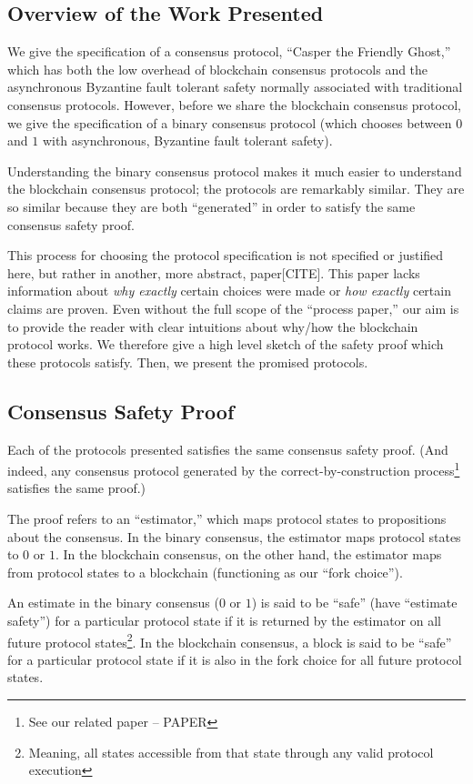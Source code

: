 \documentclass{article}
\theoremstyle{definition}
\begin{document}
\subsection{Overview of the Work Presented}

We give the specification of a consensus protocol, ``Casper the Friendly Ghost,'' which has both the low overhead of blockchain consensus protocols and the asynchronous Byzantine fault tolerant safety normally associated with traditional consensus protocols. However, before we share the blockchain consensus protocol, we give the specification of a binary consensus protocol (which chooses between $0$ and $1$ with asynchronous, Byzantine fault tolerant safety).

Understanding the binary consensus protocol makes it much easier to understand the blockchain consensus protocol; the protocols are remarkably similar. They are so similar because they are both ``generated'' in order to satisfy the same consensus safety proof.

This process for choosing the protocol specification is not specified or justified here, but rather in another, more abstract, paper[CITE]. This paper lacks information about \emph{why exactly} certain choices were made or \emph{how exactly} certain claims are proven. Even without the full scope of the ``process paper,'' our aim is to provide the reader with clear intuitions about why/how the blockchain protocol works. We therefore give a high level sketch of the safety proof which these protocols satisfy. Then, we present the promised protocols.

\subsection{Consensus Safety Proof}

Each of the protocols presented satisfies the same consensus safety proof. (And indeed, any consensus protocol generated by the correct-by-construction process\footnote{See our related paper -- PAPER} satisfies the same proof.)

The proof refers to an ``estimator,'' which maps protocol states to propositions about the consensus. In the binary consensus, the estimator maps protocol states to $0$ or $1$. In the blockchain consensus, on the other hand, the estimator maps from protocol states to a blockchain (functioning as our ``fork choice'').

An estimate in the binary consensus ($0$ or $1$) is said to be ``safe'' (have ``estimate safety'') for a particular protocol state if it is returned by the estimator on all future protocol states\footnote{Meaning, all states accessible from that state through any valid protocol execution}. In the blockchain consensus, a block is said to be ``safe'' for a particular protocol state if it is also in the fork choice for all future protocol states.
\end{document}
